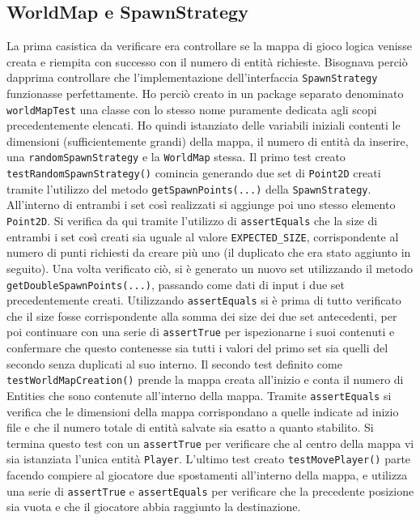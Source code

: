 \documentclass[a4paper,12pt]{report}
\begin{document}
\subsection{WorldMap e SpawnStrategy}
La prima casistica da verificare era controllare se la mappa di gioco logica venisse creata e riempita con successo con il numero di entità richieste. Bisognava perciò dapprima controllare che l'implementazione dell'interfaccia \verb|SpawnStrategy| funzionasse perfettamente. Ho perciò creato in un package separato denominato \verb|worldMapTest| una classe con lo stesso nome puramente dedicata agli scopi precedentemente elencati. Ho quindi istanziato delle variabili iniziali contenti le dimensioni (sufficientemente grandi) della mappa, il numero di entità da inserire, una \verb|randomSpawnStrategy| e la \verb|WorldMap| stessa.
Il primo test creato \verb|testRandomSpawnStrategy()| comincia generando due set di \verb|Point2D| creati tramite l'utilizzo del metodo \verb|getSpawnPoints(...)| della \verb|SpawnStrategy|.
All'interno di entrambi i set così realizzati si aggiunge poi uno stesso elemento \verb|Point2D|. Si verifica da qui tramite l'utilizzo di \verb|assertEquals| che la size di entrambi i set così creati sia uguale al valore \verb|EXPECTED_SIZE|, corrispondente al numero di punti richiesti da creare più uno (il duplicato che era stato aggiunto in seguito).
Una volta verificato ciò, si è generato un nuovo set utilizzando il metodo \verb|getDoubleSpawnPoints(...)|, passando come dati di input i due set precedentemente creati. Utilizzando \verb|assertEquals| si è prima di tutto verificato che il size fosse corrispondente alla somma dei size dei due set antecedenti, per poi continuare con una serie di \verb|assertTrue| per ispezionarne i suoi contenuti e confermare che questo contenesse sia tutti i valori del primo set sia quelli del secondo senza duplicati al suo interno.
Il secondo test definito come \verb|testWorldMapCreation()| prende la mappa creata all'inizio e conta il numero di Entities che sono contenute all'interno della mappa. Tramite \verb|assertEquals| si verifica che le dimensioni della mappa corrispondano a quelle indicate ad inizio file e che il numero totale di entità salvate sia esatto a quanto stabilito. Si termina questo test con un \verb|assertTrue| per verificare che al centro della mappa vi sia istanziata l'unica entità \verb|Player|.
L'ultimo test creato \verb|testMovePlayer()| parte facendo compiere al giocatore due spostamenti all'interno della mappa, e utilizza una serie di \verb|assertTrue| e \verb|assertEquals| per verificare che la precedente posizione sia vuota e che il giocatore abbia raggiunto la destinazione.
\end{document}
